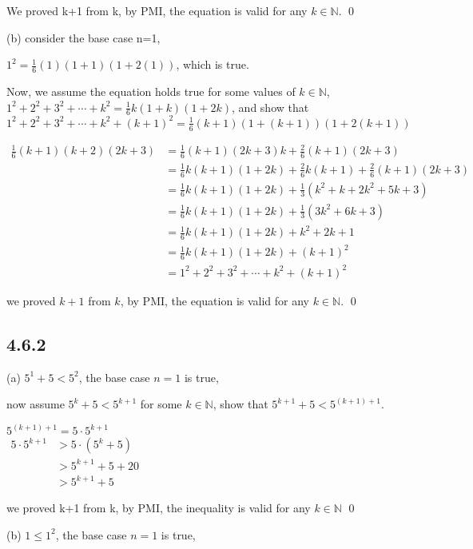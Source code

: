 \documentclass{article}
\begin{document}
We proved k+1 from k, by PMI, the equation is valid for any $k\in \mathbb{N}$. \qed

(b) consider the base case n=1,

$1^2=\frac{1}{6}(1)(1+1)(1+2(1))$, which is true.

Now, we assume the equation holds true for some values of $k \in \mathbb{N}$, $1^2+2^2+3^2+\cdots+k^2=\frac16k(1+k)(1+2k)$, and show that $1^2+2^2+3^2+\cdots+k^2+(k+1)^2=\frac16(k+1)(1+(k+1))(1+2(k+1))$

\begin{center}
    $\begin{aligned}
\frac{1}{6}(k+1)(k+2)(2k+3)& =\frac{1}{6}(k+1)(2k+3)k+\frac{2}{6}(k+1)(2k+3)  \\
&=\frac{1}{6}k(k+1)(1+2k)+\frac{2}{6}k(k+1)+\frac{2}{6}(k+1)(2k+3) \\
&=\frac{1}{6}k(k+1)(1+2k)+\frac{1}{3}(k^{2}+k+2k^{2}+5k+3) \\
&=\frac{1}{6}k(k+1)(1+2k)+\frac{1}{3}(3k^{2}+6k+3) \\
&=\frac{1}{6}k(k+1)(1+2k)+k^{2}+2k+1 \\
&=\frac{1}{6}k(k+1)(1+2k)+(k+1)^{2} \\
&=1^{2}+2^{2}+3^{2}+\cdots+k^{2}+(k+1)^{2}
\end{aligned}$
\end{center}

we proved $k+1$ from $k$, by PMI, the equation is valid for any $k\in \mathbb{N}$. \qed

\subsection*{4.6.2}

(a) $5^1+5<5^2$, the base case $n=1$ is true,

now assume $5^k+5<5^{k+1}$ for some $k\in \mathbb{N}$, show that $5^{k+1}+5<5^{(k+1)+1}$.

\begin{center}
    $5^{(k+1)+1}=5\cdot5^{k+1}$\\
$\begin{aligned}5\cdot5^{k+1}&>5\cdot(5^{k}+5)\\&>5^{k+1}+5+20\\&>5^{k+1}+5\end{aligned}$
\end{center}

we proved k+1 from k, by PMI, the inequality is valid for any $k \in \mathbb{N}$ \qed

(b) $1\leq1^2$, the base case $n=1$ is true,
\end{document}
